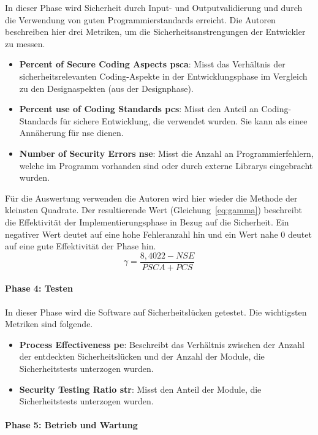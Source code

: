 \documentclass[12pt, a4paper, ngerman]{article}
\begin{document}
In dieser Phase wird Sicherheit durch Input- und Outputvalidierung und durch die Verwendung von guten Programmierstandards erreicht.
Die Autoren beschreiben hier drei Metriken, um die Sicherheitsanstrengungen der Entwickler zu messen.
\begin{itemize}
  \item \textbf{Percent of Secure Coding Aspects \acs{psca}}: Misst das Verhältnis der sicherheitsrelevanten Coding-Aspekte in der Entwicklungsphase im Vergleich zu den Designaspekten (aus der Designphase).
  \item \textbf{Percent use of Coding Standards \acs{pcs}}: Misst den Anteil an Coding-Standards für sichere Entwicklung, die verwendet wurden. Sie kann als einee Annäherung für \ac{nse} dienen.
  \item \textbf{Number of Security Errors \acs{nse}}: Misst die Anzahl an Programmierfehlern, welche im Programm vorhanden sind oder durch externe Librarys eingebracht wurden.
\end{itemize}
Für die Auswertung verwenden die Autoren wird hier wieder die Methode der kleinsten Quadrate.
Der resultierende Wert \gamma (Gleichung~\ref{eq:gamma}) beschreibt die Effektivität der Implementierungsphase in Bezug auf die Sicherheit.
Ein negativer \gamma Wert deutet auf eine hohe Fehleranzahl hin und ein Wert nahe 0 deutet auf eine gute Effektivität der Phase hin.
\begin{equation} \label{eq:gamma}
  \gamma = \frac{ 8,4022 - NSE }{ PSCA + PCS }
\end{equation}

\paragraph{Phase 4: Testen}

In dieser Phase wird die Software auf Sicherheitslücken getestet.
Die wichtigsten Metriken sind folgende.
\begin{itemize}
  \item \textbf{Process Effectiveness \acs{pe}}: Beschreibt das Verhältnis zwischen der Anzahl der entdeckten Sicherheitslücken und der Anzahl der Module, die Sicherheitstests unterzogen wurden.
  \item \textbf{Security Testing Ratio \acs{str}}: Misst den Anteil der Module, die Sicherheitstests unterzogen wurden.
\end{itemize}

\paragraph{Phase 5: Betrieb und Wartung}
\end{document}

